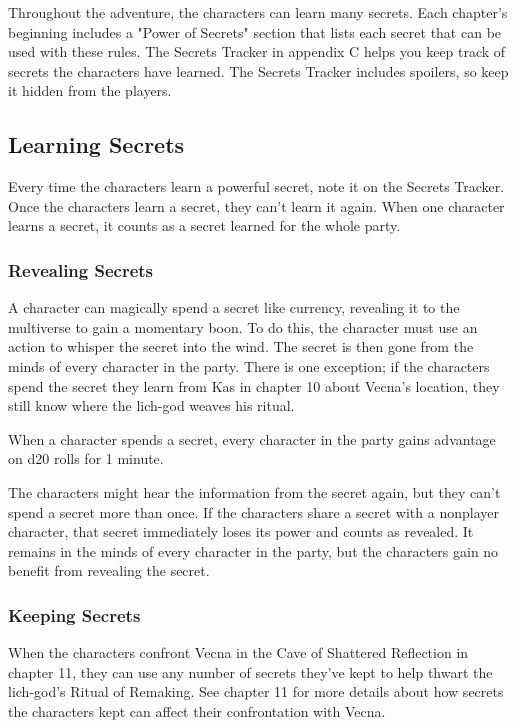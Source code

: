 \documentclass[10pt,a4paper,twoside,bg=print,twocolumn,openany,nodeprecatedcode]{dndbook}
\begin{document}
Throughout the adventure, the characters can learn many secrets. Each chapter's beginning includes a "Power of Secrets" section that lists each secret that can be used with these rules. The Secrets Tracker in appendix C helps you keep track of secrets the characters have learned. The Secrets Tracker includes spoilers, so keep it hidden from the players.

\subsection{Learning Secrets}
Every time the characters learn a powerful secret, note it on the Secrets Tracker. Once the characters learn a secret, they can't learn it again. When one character learns a secret, it counts as a secret learned for the whole party.

\subsubsection{Revealing Secrets}
A character can magically spend a secret like currency, revealing it to the multiverse to gain a momentary boon. To do this, the character must use an action to whisper the secret into the wind. The secret is then gone from the minds of every character in the party. There is one exception; if the characters spend the secret they learn from Kas in chapter 10 about Vecna's location, they still know where the lich-god weaves his ritual.

When a character spends a secret, every character in the party gains advantage on d20 rolls for 1 minute.

The characters might hear the information from the secret again, but they can't spend a secret more than once. If the characters share a secret with a nonplayer character, that secret immediately loses its power and counts as revealed. It remains in the minds of every character in the party, but the characters gain no benefit from revealing the secret.

\subsubsection{Keeping Secrets}
When the characters confront Vecna in the Cave of Shattered Reflection in chapter 11, they can use any number of secrets they've kept to help thwart the lich-god's Ritual of Remaking. See chapter 11 for more details about how secrets the characters kept can affect their confrontation with Vecna.
\end{document}
